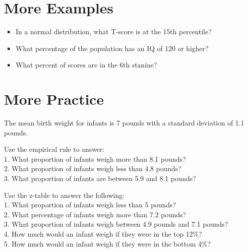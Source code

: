 \documentclass[12pt]{article}
\begin{document}
\section{More Examples}\label{more-examples}

\begin{itemize}
\itemsep1pt\parskip0pt
\item
  In a normal distribution, what T-score is at the 15th percentile?
\item
  What percentage of the population has an IQ of 120 or higher?
\item
  What percent of scores are in the 6th stanine?
\end{itemize}

\section{More Practice}\label{more-practice}

The mean birth weight for infants is 7 pounds with a standard deviation
of 1.1 pounds.

Use the empirical rule to answer:\\1. What proportion of infants weigh
more than 8.1 pounds?\\2. What proportion of infants weigh less than 4.8
pounds?\\3. What proportion of infants are between 5.9 and 8.1 pounds?

Use the z-table to answer the following:\\1. What proportion of infants
weigh less than 5 pounds?\\2. What percentage of infants weigh more than
7.2 pounds?\\3. What proportion of infants weigh between 4.9 pounds and
7.1 pounds?\\4. How much would an infant weigh if they were in the top
12\%?\\5. How much would an infant weigh if they were in the bottom 4\%?
\end{document}
